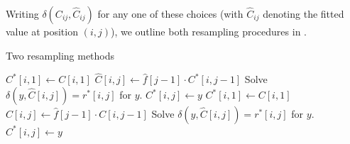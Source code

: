 \documentclass[a4paper]{book}
\theoremstyle{plain}
\begin{document}
Writing $\delta(C_{ij}, \hat{C}_{ij})$ for any one of these choices (with $\hat{C}_{ij}$ denoting the fitted value at position $(i, j)$), we outline both resampling procedures in .

\begin{algorithm}
  \caption{Two resampling methods} \label{alg:resampling}
  \begin{algorithmic}
          \vspace{2pt}
                  \vspace{2pt}
                  \State $C^*[i, 1] \gets C[i, 1]$
                  \vspace{2pt}
              \EndFor
                      \vspace{2pt}
                      \State $\hat{C}[i, j] \gets \hat{f}[j - 1] \cdot C^*[i, j - 1]$
                      \vspace{2pt}
                      \State Solve $\delta(y, \hat{C}[i, j]) = r^*[i, j]$ for $y$.
                      \vspace{2pt}
                      \State $C^*[i, j] \gets y$
                      \vspace{2pt}
                  \EndFor
              \EndFor
          \State {}
      \EndProcedure
      \State
      \vspace{2pt}
              \vspace{2pt}
              \State $C^*[i, 1] \gets C[i, 1]$
              \vspace{2pt}
          \EndFor
                  \vspace{2pt}
                  \State $\hat{C}[i, j] \gets \hat{f}[j - 1] \cdot C[i, j - 1]$
                  \vspace{2pt}
                  \State Solve $\delta(y, \hat{C}[i, j]) = r^*[i, j]$ for $y$.
                  \vspace{2pt}
                  \State $C^*[i, j] \gets y$
                  \vspace{2pt}
              \EndFor
          \EndFor
      \State {}
  \EndProcedure
  \end{algorithmic}
\end{algorithm}
\end{document}
